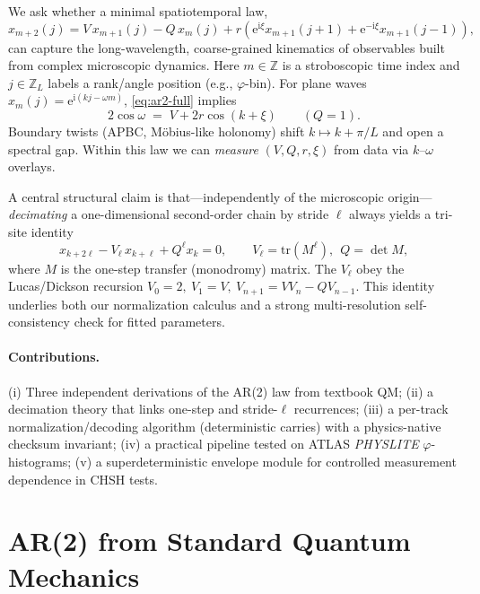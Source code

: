\documentclass[11pt]{article}
\newcommand{\Z}{\mathbb{Z}}
\newcommand{\e}{\mathrm{e}}
\newcommand{\im}{\mathrm{i}}
\begin{document}
We ask whether a minimal spatiotemporal law,
\begin{equation}
\label{eq:ar2-full}
x_{m+2}(j) = V\,x_{m+1}(j) - Q\,x_m(j) + r\!\left(\e^{\im\xi} x_{m+1}(j{+}1) + \e^{-\im\xi} x_{m+1}(j{-}1)\right),
\end{equation}
can capture the long-wavelength, coarse-grained kinematics of observables built from complex
microscopic dynamics. Here $m\in\Z$ is a stroboscopic time index and $j\in\Z_L$ labels a rank/angle
position (e.g., $\varphi$-bin). For plane waves $x_m(j)=\e^{\im(kj-\omega m)}$, \eqref{eq:ar2-full}
implies
\begin{equation}
\label{eq:dispersion}
2\cos\omega \;=\; V + 2r\cos(k+\xi)\qquad(Q=1).
\end{equation}
Boundary twists (APBC, M\"obius-like holonomy) shift $k\mapsto k+\pi/L$ and open a spectral gap.
Within this law we can \emph{measure} $(V,Q,r,\xi)$ from data via $k$--$\omega$ overlays.

A central structural claim is that---independently of the microscopic origin---\emph{decimating} a
one-dimensional second-order chain by stride $\ell$ always yields a tri-site identity
\begin{equation}
\label{eq:decimated}
x_{k+2\ell} - V_\ell\,x_{k+\ell} + Q^\ell x_k = 0,\qquad
V_\ell=\mathrm{tr}(M^\ell),\ \ Q=\det M,
\end{equation}
where $M$ is the one-step transfer (monodromy) matrix. The $V_\ell$ obey the Lucas/Dickson recursion
$V_0=2,\ V_1=V,\ V_{n+1}=V V_n - Q V_{n-1}$. This identity underlies both our normalization calculus
and a strong multi-resolution self-consistency check for fitted parameters.

\paragraph{Contributions.} (i) Three independent derivations of the AR(2) law from textbook QM;
(ii) a decimation theory that links one-step and stride-$\ell$ recurrences; (iii) a per-track
normalization/decoding algorithm (deterministic carries) with a physics-native checksum invariant;
(iv) a practical pipeline tested on ATLAS \emph{PHYSLITE} $\varphi$-histograms; (v) a superdeterministic
envelope module for controlled measurement dependence in CHSH tests.

\section{AR(2) from Standard Quantum Mechanics}
\label{sec:qm-to-ar2}
\end{document}
